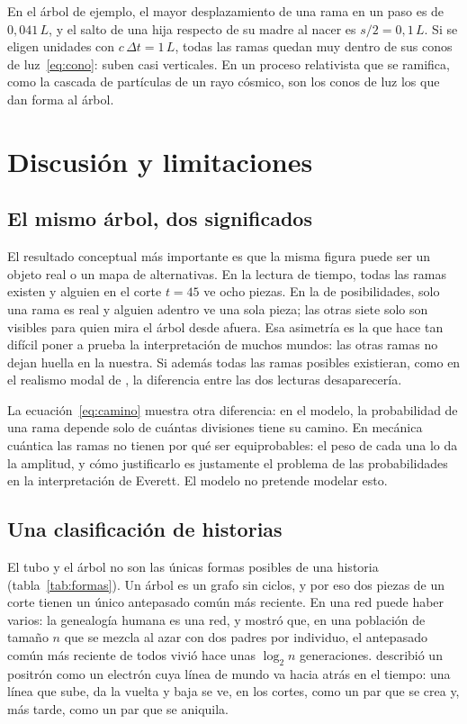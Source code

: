 \documentclass[11pt,a4paper]{article}
\begin{document}
En el árbol de ejemplo, el mayor desplazamiento de una rama en un paso es de $0{,}041\,L$, y el salto de una hija respecto de su madre al nacer es $s/2 = 0{,}1\,L$. Si se eligen unidades con $c\,\Delta t = 1\,L$, todas las ramas quedan muy dentro de sus conos de luz~\eqref{eq:cono}: suben casi verticales. En un proceso relativista que se ramifica, como la cascada de partículas de un rayo cósmico, son los conos de luz los que dan forma al árbol.

\section{Discusión y limitaciones}\label{sec:discusion}

\subsection{El mismo árbol, dos significados}

El resultado conceptual más importante es que la misma figura puede ser un objeto real o un mapa de alternativas. En la lectura de tiempo, todas las ramas existen y alguien en el corte $t = 45$ ve ocho piezas. En la de posibilidades, solo una rama es real y alguien adentro ve una sola pieza; las otras siete solo son visibles para quien mira el árbol desde afuera. Esa asimetría es la que hace tan difícil poner a prueba la interpretación de muchos mundos: las otras ramas no dejan huella en la nuestra. Si además todas las ramas posibles existieran, como en el realismo modal de \textcite{lewis1986}, la diferencia entre las dos lecturas desaparecería.

La ecuación~\eqref{eq:camino} muestra otra diferencia: en el modelo, la probabilidad de una rama depende solo de cuántas divisiones tiene su camino. En mecánica cuántica las ramas no tienen por qué ser equiprobables: el peso de cada una lo da la amplitud, y cómo justificarlo es justamente el problema de las probabilidades en la interpretación de Everett. El modelo no pretende modelar esto.

\subsection{Una clasificación de historias}

El tubo y el árbol no son las únicas formas posibles de una historia (tabla~\ref{tab:formas}). Un árbol es un grafo sin ciclos, y por eso dos piezas de un corte tienen un único antepasado común más reciente. En una red puede haber varios: la genealogía humana es una red, y \textcite{chang1999} mostró que, en una población de tamaño $n$ que se mezcla al azar con dos padres por individuo, el antepasado común más reciente de todos vivió hace unas $\log_2 n$ generaciones. \textcite{feynman1949} describió un positrón como un electrón cuya línea de mundo va hacia atrás en el tiempo: una línea que sube, da la vuelta y baja se ve, en los cortes, como un par que se crea y, más tarde, como un par que se aniquila.
\end{document}
